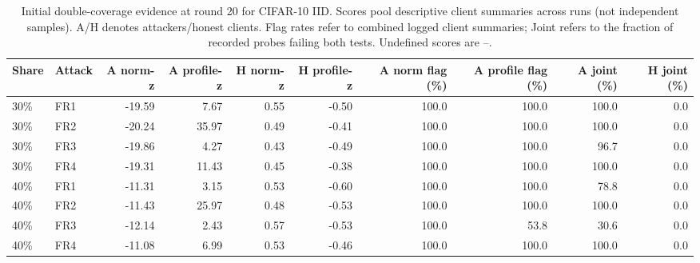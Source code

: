 \documentclass[conference]{IEEEtran}
\begin{document}
\begin{table}[t]\centering\scriptsize
\setlength{\tabcolsep}{3.5pt}
\caption{Initial double-coverage evidence at round 20 for CIFAR-10 IID. Scores pool descriptive client summaries across runs (not independent samples). A/H denotes attackers/honest clients. Flag rates refer to combined logged client summaries; Joint refers to the fraction of recorded probes failing both tests. Undefined scores are --.}
\begin{tabular}{llrrrrrrrr}\toprule
Share & Attack & A norm-z & A profile-z & H norm-z & H profile-z & A norm flag (\%) & A profile flag (\%) & A joint (\%) & H joint (\%) \\\midrule
30\% & FR1 & -19.59 & 7.67 & 0.55 & -0.50 & 100.0 & 100.0 & 100.0 & 0.0 \\
30\% & FR2 & -20.24 & 35.97 & 0.49 & -0.41 & 100.0 & 100.0 & 100.0 & 0.0 \\
30\% & FR3 & -19.86 & 4.27 & 0.43 & -0.49 & 100.0 & 100.0 & 96.7 & 0.0 \\
30\% & FR4 & -19.31 & 11.43 & 0.45 & -0.38 & 100.0 & 100.0 & 100.0 & 0.0 \\
40\% & FR1 & -11.31 & 3.15 & 0.53 & -0.60 & 100.0 & 100.0 & 78.8 & 0.0 \\
40\% & FR2 & -11.43 & 25.97 & 0.48 & -0.53 & 100.0 & 100.0 & 100.0 & 0.0 \\
40\% & FR3 & -12.14 & 2.43 & 0.57 & -0.53 & 100.0 & 53.8 & 30.6 & 0.0 \\
40\% & FR4 & -11.08 & 6.99 & 0.53 & -0.46 & 100.0 & 100.0 & 100.0 & 0.0 \\
\bottomrule\end{tabular}\end{table}
\end{document}
